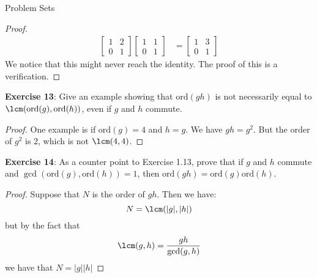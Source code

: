 \documentclass{report}
\begin{document}
\begin{exercises}{Problem Sets}
\begin{proof}
\begin{align*}
\begin{bmatrix}
                        1 & 2 \\
                        0 & 1   
                    \end{bmatrix} 
                    \begin{bmatrix}
                        1 & 1 \\
                        0 & 1   
                    \end{bmatrix}  &=
                    \begin{bmatrix}
                        1 & 3 \\
                        0 & 1   
                    \end{bmatrix}
                \end{align*}
            We notice that this might never reach the identity. The proof of this is a verification.
        \end{proof}

    \textbf{Exercise 13}: Give an example showing that $\text{ord}(gh)$ is not necessarily equal to $\lcm(\text{ord}(g), \text{ord}(h))$, even if $g$ and $h$ commute.
        \begin{proof}
            One example is if $\text{ord}(g) = 4$ and $h = g$. We have $gh = g^{2}$. But the order of $g^{2}$ is $2$, which is not $\lcm(4, 4)$.
        \end{proof}

    \textbf{Exercise 14}: As a counter point to Exercise 1.13, prove that if $g$ and $h$ commute and $\gcd(\text{ord}(g), \text{ord}(h)) = 1$, then $\text{ord}(gh) = \text{ord}(g)\text{ord}(h)$.
        \begin{proof}
            Suppose that $N$ is the order of $gh$. Then we have:
                \begin{equation*}
                    N = \lcm(\lvert g \rvert, \lvert h \rvert)
                \end{equation*}
            but by the fact that
                \begin{equation*}
                    \lcm(g, h) = \dfrac{gh}{\gcd(g, h)}
                \end{equation*}
            we have that $N = \lvert g \rvert\lvert h \rvert$
        \end{proof}


\end{exercises}
\end{document}
